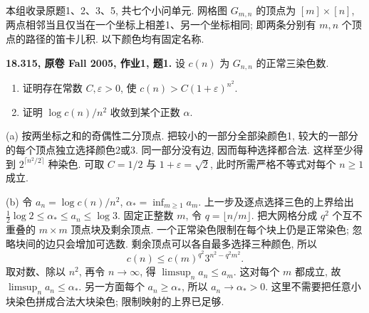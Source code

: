 本组收录原题1、2、3、5, 共七个小问单元. 网格图 $G_{m,n}$ 的顶点为
$[m]\times[n]$, 两点相邻当且仅当在一个坐标上相差1、另一个坐标相同;
即两条分别有 $m,n$ 个顶点的路径的笛卡儿积. 以下颜色均有固定名称.

\begin{exercise}\label{mit:18315-hw1-q1}
\textbf{18.315, 原卷 Fall 2005, 作业1, 题1.}
设 $c(n)$ 为 $G_{n,n}$ 的正常三染色数.
\begin{enumerate}[label=(\alph*)]
\item 证明存在常数 $C,\varepsilon>0$, 使 $c(n)>C(1+\varepsilon)^{n^2}$.
\item 证明 $\log c(n)/n^2$ 收敛到某个正数 $\alpha$.
\end{enumerate}
\end{exercise}
\begin{solution}
(a) 按两坐标之和的奇偶性二分顶点. 把较小的一部分全部染颜色1,
较大的一部分的每个顶点独立选择颜色2或3. 同一部分没有边, 因而每种选择都合法.
这样至少得到 $2^{\lceil n^2/2\rceil}$ 种染色. 可取 $C=1/2$ 与
$1+\varepsilon=\sqrt2$, 此时所需严格不等式对每个 $n\ge1$ 成立.

(b) 令 $a_n=\log c(n)/n^2$, $\alpha_* =\inf_{m\ge1}a_m$.
上一步及逐点选择三色的上界给出
$\tfrac12\log2\le\alpha_*\le a_n\le\log3$.
固定正整数 $m$, 令 $q=\lfloor n/m\rfloor$.
把大网格分成 $q^2$ 个互不重叠的 $m\times m$ 顶点块及剩余顶点.
一个正常染色限制在每个块上仍是正常染色; 忽略块间的边只会增加可选数.
剩余顶点可以各自最多选择三种颜色, 所以
\[
c(n)\le c(m)^{q^2}3^{n^2-q^2m^2}.
\]
取对数、除以 $n^2$, 再令 $n\to\infty$, 得 $\limsup_n a_n\le a_m$.
这对每个 $m$ 都成立, 故 $\limsup_n a_n\le\alpha_*$.
另一方面每个 $a_n\ge\alpha_*$, 所以 $a_n\to\alpha_* >0$.
这里不需要把任意小块染色拼成合法大块染色; 限制映射的上界已足够.
\end{solution}

